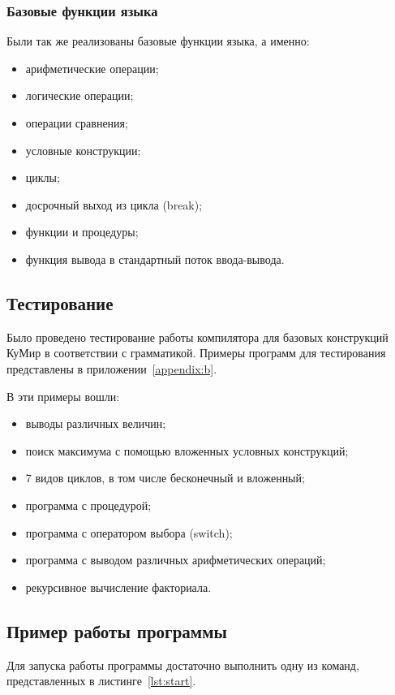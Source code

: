 \subsubsection*{Базовые функции языка}

Были так же реализованы базовые функции языка, а именно:
\begin{itemize}
    \item арифметические операции;
    \item логические операции;
    \item операции сравнения;
    \item условные конструкции;
    \item циклы;
    \item досрочный выход из цикла (break);
    \item функции и процедуры;
    \item функция вывода в стандартный поток ввода-вывода.
\end{itemize}

\subsection{Тестирование}

Было проведено тестирование работы компилятора для базовых конструкций КуМир в соответствии с грамматикой. Примеры программ для тестирования представлены в приложении~\ref{appendix:b}.

В эти примеры вошли:
\begin{itemize}
    \item выводы различных величин;
    \item поиск максимума с помощью вложенных условных конструкций;
    \item 7 видов циклов, в том числе бесконечный и вложенный;
    \item программа с процедурой;
    \item программа с оператором выбора (switch);
    \item программа с выводом различных арифметических операций;
    \item рекурсивное вычисление факториала.
\end{itemize}

\subsection{Пример работы программы}

Для запуска работы программы достаточно выполнить одну из команд, представленных в листинге~\ref{lst:start}.

